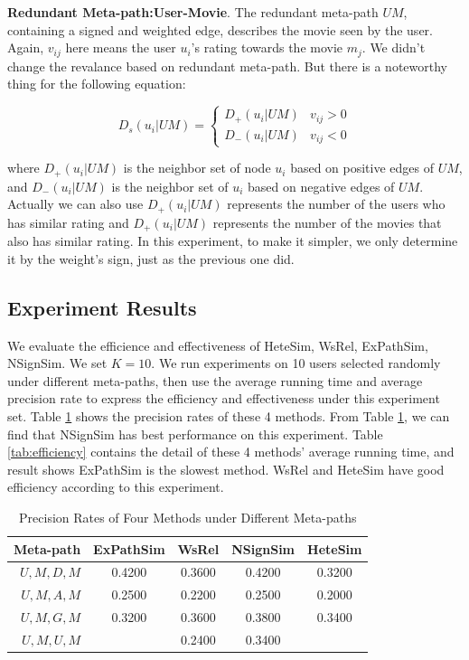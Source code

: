 \documentclass{acm_proc_article-csis8101}
\begin{document}
\textbf{Redundant Meta-path:User-Movie}. The redundant meta-path $UM$, containing a signed and weighted edge, describes the movie seen by the user. Again, $v_{ij}$ here means the user $u_{i}$'s rating towards the movie $m_{j}$. We didn't change the revalance based on redundant meta-path. But there is a noteworthy thing for the following equation:

\begin{equation}
D_{s}(u_{i}|UM)=
\begin{cases}
D_{+}(u_{i}|UM)& v_{ij} > 0 \\
D_{-}(u_{i}|UM)& v_{ij} < 0
\end{cases}
\end{equation}

where $D_{+}(u_{i}|UM)$ is the neighbor set of node $u_{i}$ based on positive edges of $UM$, and $D_{-}(u_{i}|UM)$ is the neighbor set of $u_{i}$ based on negative edges of $UM$. Actually we can also use $D_{+}(u_{i}|UM)$ represents the number of the users who has similar rating and $D_{+}(u_{i}|UM)$ represents the number of the movies that also has similar rating. In this experiment, to make it simpler, we only determine it by the weight's sign, just as the previous one did.

\subsection{Experiment Results}

We evaluate the efficience and effectiveness of HeteSim, WsRel, ExPathSim, NSignSim. We set $K = 10$. We run experiments on 10 users selected randomly under different meta-paths, then use the average running time and average precision rate to express the efficiency and effectiveness under this experiment set. Table \ref{tab:precision} shows the precision rates of these 4 methods. From Table \ref{tab:precision}, we can find that NSignSim has best performance on this experiment. Table \ref{tab:efficiency} contains the detail of these 4 methods' average running time, and result shows ExPathSim is the slowest method. WsRel and HeteSim have good efficiency according to this experiment.

\begin{table}
\centering
\caption{Precision Rates of Four Methods under Different Meta-paths} 
\label{tab:precision}
\begin{tabular}{|r|c|c|c|c|} \hline
Meta-path & ExPathSim & WsRel & NSignSim & HeteSim \\ \hline
$U,M,D,M$ & 0.4200 & 0.3600 & 0.4200 & 0.3200 \\ \hline
$U,M,A,M$ & 0.2500 & 0.2200 & 0.2500 & 0.2000 \\ \hline
$U,M,G,M$ & 0.3200 & 0.3600 & 0.3800 & 0.3400 \\ \hline
$U,M,U,M$ &  & 0.2400 & 0.3400 &  \\ \hline
\end{tabular}
\end{table}
\end{document}
